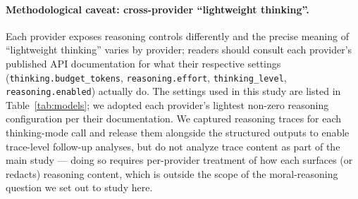 \documentclass{article}
\begin{document}
\paragraph{Methodological caveat: cross-provider ``lightweight thinking''.}
Each provider exposes reasoning controls differently and the precise meaning of ``lightweight thinking'' varies by provider; readers should consult each provider's published API documentation for what their respective settings (\texttt{thinking.budget\_tokens}, \texttt{reasoning.effort}, \texttt{thinking\_level}, \texttt{reasoning.enabled}) actually do. The settings used in this study are listed in Table~\ref{tab:models}; we adopted each provider's lightest non-zero reasoning configuration per their documentation. We captured reasoning traces for each thinking-mode call and release them alongside the structured outputs to enable trace-level follow-up analyses, but do not analyze trace content as part of the main study --- doing so requires per-provider treatment of how each surfaces (or redacts) reasoning content, which is outside the scope of the moral-reasoning question we set out to study here.
\end{document}
